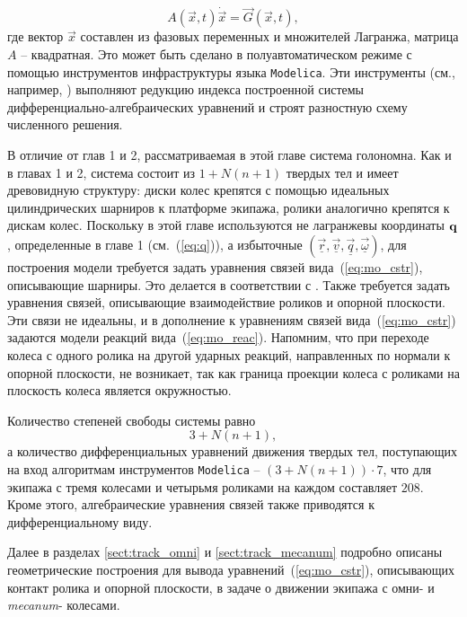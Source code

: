 $$ A(\vec{x}, t)\dot{\vec{x}} = \vec{G}(\vec{x}, t), $$
где вектор $\vec{x}$ составлен из фазовых переменных и множителей Лагранжа, матрица $A$ -- квадратная.
Это может быть сделано в полуавтоматическом режиме с помощью инструментов инфраструктуры языка \texttt{Modelica}. Эти инструменты (см., например, \cite{Fritzson}) выполняют редукцию индекса построенной системы дифференциально-алгебраических уравнений и строят разностную схему численного решения.

В отличие от глав 1 и 2, рассматриваемая в этой главе система голономна. Как и в главах 1 и 2, система состоит из $1 + N(n+1)$ твердых тел и имеет древовидную структуру: диски колес крепятся с помощью идеальных цилиндрических шарниров к платформе экипажа, ролики аналогично крепятся к дискам колес. Поскольку в этой главе используются не лагранжевы координаты $\mathbf{q}$, определенные в главе 1 (см.~(\ref{eq:q})), а избыточные $\left(\vec{\underline{r}}, \vec{\underline{v}}, \vec{\underline{q}}, \vec{\underline{\omega}}\right)$, для построения модели требуется задать уравнения связей вида~(\ref{eq:mo_cstr}), описывающие шарниры. Это делается в соответствии с \cite{KosenkoGraphs2009}. Также требуется задать уравнения связей, описывающие взаимодействие роликов и опорной плоскости. Эти связи не идеальны, и в дополнение к уравнениям связей вида~(\ref{eq:mo_cstr}) задаются модели реакций вида~(\ref{eq:mo_reac}). Напомним, что при переходе колеса с одного ролика на другой ударных реакций, направленных по нормали к опорной плоскости, не возникает, так как граница проекции колеса с роликами на плоскость колеса является окружностью.

Количество степеней свободы системы равно
$$ 3 + N(n + 1),$$
а количество дифференциальных уравнений движения твердых тел, поступающих на вход алгоритмам инструментов \texttt{Modelica} -- $(3 + N(n + 1)) \cdot 7$, что для экипажа с тремя колесами и четырьмя роликами на каждом составляет $208$. Кроме этого, алгебраические уравнения связей также приводятся к дифференциальному виду.

Далее в разделах \ref{sect:track_omni} и \ref{sect:track_mecanum} подробно описаны геометрические построения для вывода уравнений~(\ref{eq:mo_cstr}), описывающих контакт ролика и опорной плоскости, в задаче о движении экипажа с омни- и \textit{mecanum}- колесами.
